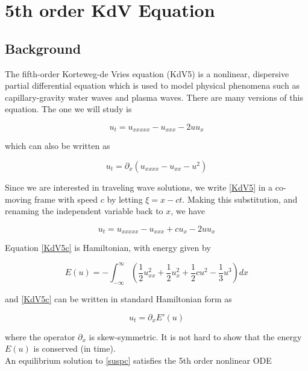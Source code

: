 \documentclass[12pt]{article}
\begin{document}
\section{5th order KdV Equation}

\subsection{Background}\label{sec:background}

The fifth-order Korteweg-de Vries equation (KdV5) is a nonlinear, dispersive partial differential equation which is used to model physical phenomena such as capillary-gravity water waves and plasma waves. There are many versions of this equation. The one we will study is

\begin{equation}\label{KdV5}
u_t = u_{xxxxx} - u_{xxx} - 2 u u_x
\end{equation}

which can also be written as

\begin{equation}\label{KdV5alt}
u_t = \partial_x(u_{xxxx} - u_{xx} - u^2)
\end{equation}

Since we are interested in traveling wave solutions, we write \eqref{KdV5} in a co-moving frame with speed $c$ by letting $\xi = x - ct$. Making this substitution, and renaming the independent variable back to $x$, we have

\begin{equation}\label{KdV5c}
u_t = u_{xxxxx} - u_{xxx} + c u_x - 2 u u_x
\end{equation}

Equation \eqref{KdV5c} is Hamiltonian, with energy given by 

\begin{equation} \label{energy}
E(u) = -\int_{-\infty}^{\infty} \left( \frac{1}{2}u_{xx}^2 + \frac{1}{2}u_x^2 + \frac{1}{2}cu^2 - \frac{1}{3}u^3 \right) dx
\end{equation}

and \eqref{KdV5c} can be written in standard Hamiltonian form as

\[
u_t = \partial_x E'(u)
\]

where the operator $\partial_x$ is skew-symmetric. It is not hard to show that the energy $E(u)$ is conserved (in time).\\

An equilibrium solution to \eqref{suspc} satisfies the 5th order nonlinear ODE
\end{document}
